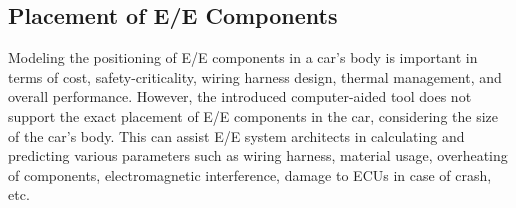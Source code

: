     \subsection{Placement of E/E Components}\label{placement}
    
    Modeling the positioning of E/E components in a car's body is important in terms of cost, safety-criticality, wiring harness design, thermal management, and overall performance. However, the introduced computer-aided tool does not support the exact placement of E/E components in the car, considering the size of the car's body. This can assist E/E system architects in calculating and predicting various parameters such as wiring harness, material usage, overheating of components, electromagnetic interference, damage to ECUs in case of crash, etc.
    
    
     
     
     
      
      
      
